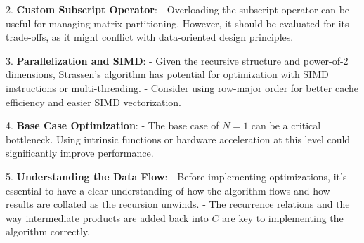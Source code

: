 \documentclass{article}
\begin{document}
2. \textbf{Custom Subscript Operator}:
    - Overloading the subscript operator can be useful for managing matrix partitioning. However, it should be evaluated for its trade-offs, as it might conflict with data-oriented design principles.

3. \textbf{Parallelization and SIMD}:
    - Given the recursive structure and power-of-2 dimensions, Strassen’s algorithm has potential for optimization with SIMD instructions or multi-threading.
    - Consider using row-major order for better cache efficiency and easier SIMD vectorization.

4. \textbf{Base Case Optimization}:
    - The base case of \( N = 1 \) can be a critical bottleneck. Using intrinsic functions or hardware acceleration at this level could significantly improve performance.

5. \textbf{Understanding the Data Flow}:
    - Before implementing optimizations, it’s essential to have a clear understanding of how the algorithm flows and how results are collated as the recursion unwinds.
    - The recurrence relations and the way intermediate products are added back into \( C \) are key to implementing the algorithm correctly.
\end{document}
